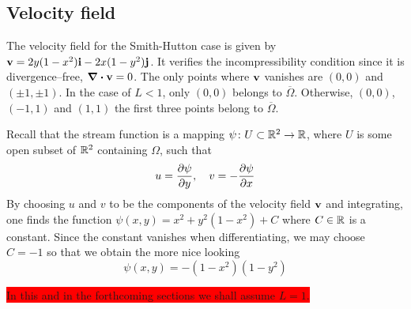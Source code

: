 
\subsection{Velocity field}

The velocity field for the Smith-Hutton case is given by $\vb{v} = 2 y (1 - x^2)
\vb{i} - 2 x (1 - y^2) \vb{j}$. It verifies the incompressibility condition
since it is divergence--free, \ie $\div{\vb{v}} = 0$. The only points where
$\vb{v}$ vanishes are $(0,0)$ and $(\pm 1, \pm 1)$. In the case of $L < 1$, only
$(0,0)$ belongs to $\overline{\Omega}$. Otherwise, $(0,0)$, $(-1,1)$ and $(1,1)$
the first three points belong to $\overline{\Omega}$. 

Recall that the
stream function is a mapping $\psi \colon U \subset \mathbb{R}^2 \to \mathbb{R}$, where
$U$ is some open subset of $\mathbb{R}^2$ containing $\Omega$, such that
\begin{equation*}
	u = \pdv{\psi}{y}, \quad
	v = -\pdv{\psi}{x}
\end{equation*}
By choosing $u$ and $v$ to be the components of the velocity field $\vb{v}$ and
integrating, one finds the function $\psi(x,y) = x^2 + y^2 (1 - x^2) + C$ where
$C \in \mathbb{R}$ is a constant. Since the constant vanishes when differentiating,
we may choose $C = -1$ so that we obtain the more nice looking
\begin{equation*}
	\psi(x,y) = -(1 - x^2)(1 - y^2)
\end{equation*}

\colorbox{red}{In this and in the forthcoming sections we shall assume $L = 1$. }

